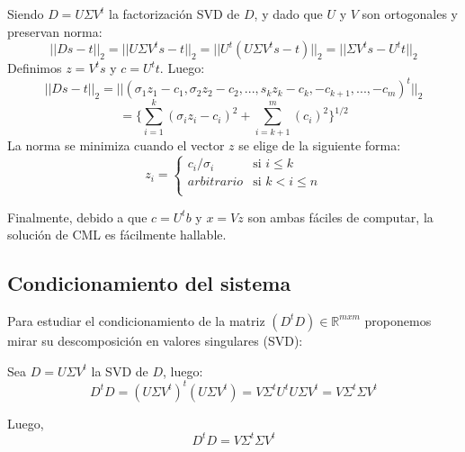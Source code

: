 Siendo $D = U \Sigma V^{t}$ la factorización SVD de $D$, y dado que $U$ y $V$ son ortogonales y preservan  norma:
\begin{equation*}
     ||Ds - t||_{2} = ||U\Sigma V^{t} s - t||_{2} = ||U^{t} (U\Sigma V^{t} s - t)||_{2} = ||\Sigma V^{t}s - U^{t}t||_{2}
\end{equation*}
Definimos $z = V^{t}s$ y $c = U^{t}t$. Luego:
\begin{equation*}
    ||Ds - t||_{2} = ||(\sigma_{1}z_{1} - c_{1},\sigma_{2}z_{2} - c_{2}, ... ,s_{k} z_{k} - c_{k} , -c_{k+1}, ... , -c_{m})^{t}||_{2}
\end{equation*}
\begin{equation*}
    = \lbrace \sum^{k}_{i=1} (\sigma_{i}z_{i} - c_{i})^{2} + \sum^{m}_{i=k+1} (c_{i})^{2} \rbrace^{1/2}
\end{equation*}
La norma se minimiza cuando el vector $z$ se elige de la siguiente forma:
\begin{equation*}
    z_{i} =
    \begin{cases}
      c_{i}/\sigma_{i} & \text{si } i \leq k \\
      arbitrario &  \text{si } k < i \leq n \\
    \end{cases}
\end{equation*}

Finalmente, debido a que $c = U^{t}b$ y $x = Vz$ son ambas f\'aciles de computar, la solución de CML es f\'acilmente hallable.
\subsection{Condicionamiento del sistema}
Para estudiar el condicionamiento de la matriz $(D^{t}D) \in  \mathbb{R}^{mxm}$
proponemos mirar su descomposición en valores singulares (SVD):

Sea $D = U \Sigma V^{t}$ la SVD de $D$, luego:
\begin{equation*}
    D^{t}D = (U\Sigma V^{t})^{t}(U\Sigma V^{t}) = V\Sigma^{t}U^{t}U\Sigma V^{t} = V\Sigma^{t}\Sigma V^{t} 
\end{equation*}

Luego,
\begin{equation}
    D^{t}D = V\Sigma^{t}\Sigma V^{t}
\end{equation}

